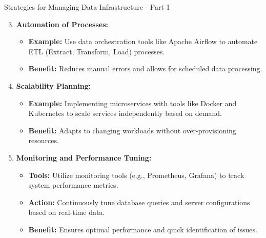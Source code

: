 \documentclass[aspectratio=169]{beamer}
\begin{document}
\begin{frame}[fragile]{Strategies for Managing Data Infrastructure - Part 1}
  \begin{enumerate}
    \setcounter{enumi}{2}
    \item \textbf{Automation of Processes:}
      \begin{itemize}
        \item \textbf{Example:} Use data orchestration tools like Apache Airflow to automate ETL (Extract, Transform, Load) processes.
        \item \textbf{Benefit:} Reduces manual errors and allows for scheduled data processing.
      \end{itemize}

    \item \textbf{Scalability Planning:}
      \begin{itemize}
        \item \textbf{Example:} Implementing microservices with tools like Docker and Kubernetes to scale services independently based on demand.
        \item \textbf{Benefit:} Adapts to changing workloads without over-provisioning resources.
      \end{itemize}

    \item \textbf{Monitoring and Performance Tuning:}
      \begin{itemize}
        \item \textbf{Tools:} Utilize monitoring tools (e.g., Prometheus, Grafana) to track system performance metrics.
        \item \textbf{Action:} Continuously tune database queries and server configurations based on real-time data.
        \item \textbf{Benefit:} Ensures optimal performance and quick identification of issues.
      \end{itemize}
  \end{enumerate}
\end{frame}
\end{document}
